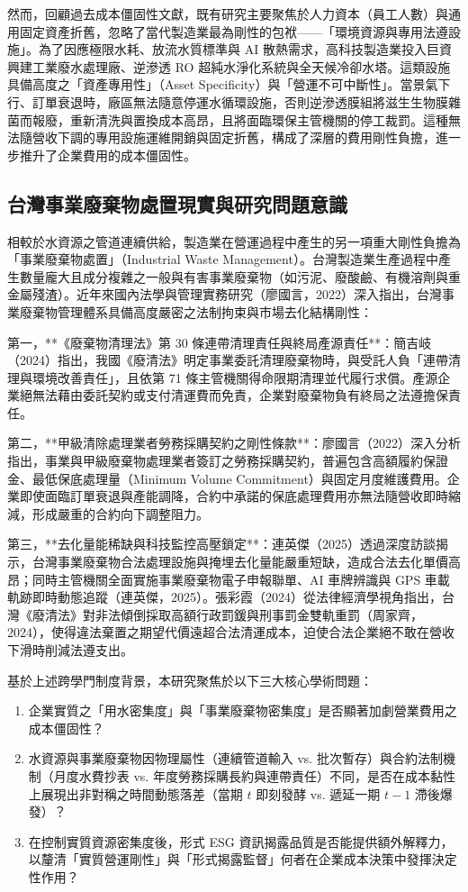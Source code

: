 \documentclass[12pt,a4paper]{article}
\begin{document}
然而，回顧過去成本僵固性文獻，既有研究主要聚焦於人力資本（員工人數）與通用固定資產折舊，忽略了當代製造業最為剛性的包袱——「環境資源與專用法遵設施」。為了因應極限水耗、放流水質標準與 AI 散熱需求，高科技製造業投入巨資興建工業廢水處理廠、逆滲透 RO 超純水淨化系統與全天候冷卻水塔。這類設施具備高度之「資產專用性」（Asset Specificity）與「營運不可中斷性」。當景氣下行、訂單衰退時，廠區無法隨意停運水循環設施，否則逆滲透膜組將滋生生物膜雜菌而報廢，重新清洗與置換成本高昂，且將面臨環保主管機關的停工裁罰。這種無法隨營收下調的專用設施運維開銷與固定折舊，構成了深層的費用剛性負擔，進一步推升了企業費用的成本僵固性。

\subsection{台灣事業廢棄物處置現實與研究問題意識}

相較於水資源之管道連續供給，製造業在營運過程中產生的另一項重大剛性負擔為「事業廢棄物處置」（Industrial Waste Management）。台灣製造業生產過程中產生數量龐大且成分複雜之一般與有害事業廢棄物（如污泥、廢酸鹼、有機溶劑與重金屬殘渣）。近年來國內法學與管理實務研究（廖國言，2022）深入指出，台灣事業廢棄物管理體系具備高度嚴密之法制拘束與市場去化結構剛性：

第一，**《廢棄物清理法》第 30 條連帶清理責任與終局產源責任**：簡吉岐（2024）指出，我國《廢清法》明定事業委託清理廢棄物時，與受託人負「連帶清理與環境改善責任」，且依第 71 條主管機關得命限期清理並代履行求償。產源企業絕無法藉由委託契約或支付清運費而免責，企業對廢棄物負有終局之法遵擔保責任。

第二，**甲級清除處理業者勞務採購契約之剛性條款**：廖國言（2022）深入分析指出，事業與甲級廢棄物處理業者簽訂之勞務採購契約，普遍包含高額履約保證金、最低保底處理量（Minimum Volume Commitment）與固定月度維護費用。企業即使面臨訂單衰退與產能調降，合約中承諾的保底處理費用亦無法隨營收即時縮減，形成嚴重的合約向下調整阻力。

第三，**去化量能稀缺與科技監控高壓鎖定**：連英傑（2025）透過深度訪談揭示，台灣事業廢棄物合法處理設施與掩埋去化量能嚴重短缺，造成合法去化單價高昂；同時主管機關全面實施事業廢棄物電子申報聯單、AI 車牌辨識與 GPS 車載軌跡即時動態追蹤（連英傑，2025）。張彩霞（2024）從法律經濟學視角指出，台灣《廢清法》對非法傾倒採取高額行政罰鍰與刑事罰金雙軌重罰（周家齊，2024），使得違法棄置之期望代價遠超合法清運成本，迫使合法企業絕不敢在營收下滑時削減法遵支出。

基於上述跨學門制度背景，本研究聚焦於以下三大核心學術問題：
\begin{enumerate}[leftmargin=*]
    \item 企業實質之「用水密集度」與「事業廢棄物密集度」是否顯著加劇營業費用之成本僵固性？
    \item 水資源與事業廢棄物因物理屬性（連續管道輸入 vs. 批次暫存）與合約法制機制（月度水費抄表 vs. 年度勞務採購長約與連帶責任）不同，是否在成本黏性上展現出非對稱之時間動態落差（當期 $t$ 即刻發酵 vs. 遞延一期 $t-1$ 滯後爆發）？
    \item 在控制實質資源密集度後，形式 ESG 資訊揭露品質是否能提供額外解釋力，以釐清「實質營運剛性」與「形式揭露監督」何者在企業成本決策中發揮決定性作用？
\end{enumerate}
\end{document}
